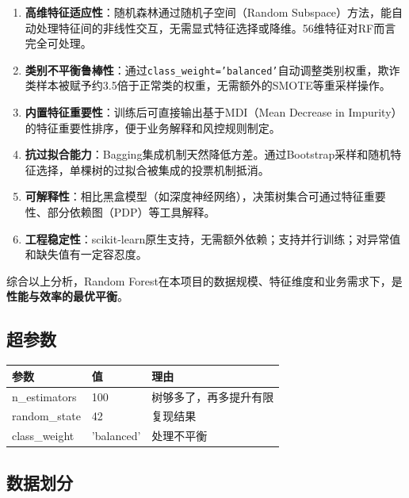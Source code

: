 \documentclass[12pt,a4paper]{article}
\begin{document}
\begin{enumerate}
    \item \textbf{高维特征适应性}：随机森林通过随机子空间（Random Subspace）方法，能自动处理特征间的非线性交互，无需显式特征选择或降维。56维特征对RF而言完全可处理。
    
    \item \textbf{类别不平衡鲁棒性}：通过\texttt{class\_weight='balanced'}自动调整类别权重，欺诈类样本被赋予约3.5倍于正常类的权重，无需额外的SMOTE等重采样操作。
    
    \item \textbf{内置特征重要性}：训练后可直接输出基于MDI（Mean Decrease in Impurity）的特征重要性排序，便于业务解释和风控规则制定。
    
    \item \textbf{抗过拟合能力}：Bagging集成机制天然降低方差。通过Bootstrap采样和随机特征选择，单棵树的过拟合被集成的投票机制抵消。
    
    \item \textbf{可解释性}：相比黑盒模型（如深度神经网络），决策树集合可通过特征重要性、部分依赖图（PDP）等工具解释。
    
    \item \textbf{工程稳定性}：scikit-learn原生支持，无需额外依赖；支持并行训练；对异常值和缺失值有一定容忍度。
\end{enumerate}

综合以上分析，Random Forest在本项目的数据规模、特征维度和业务需求下，是\textbf{性能与效率的最优平衡}。

\subsection{超参数}

\begin{table}[H]
\centering
\begin{tabular}{@{}lll@{}}
\toprule
\textbf{参数} & \textbf{值} & \textbf{理由} \\
\midrule
n\_estimators & 100 & 树够多了，再多提升有限 \\
random\_state & 42 & 复现结果 \\
class\_weight & 'balanced' & 处理不平衡 \\
\bottomrule
\end{tabular}
\end{table}

\subsection{数据划分}
\end{document}
